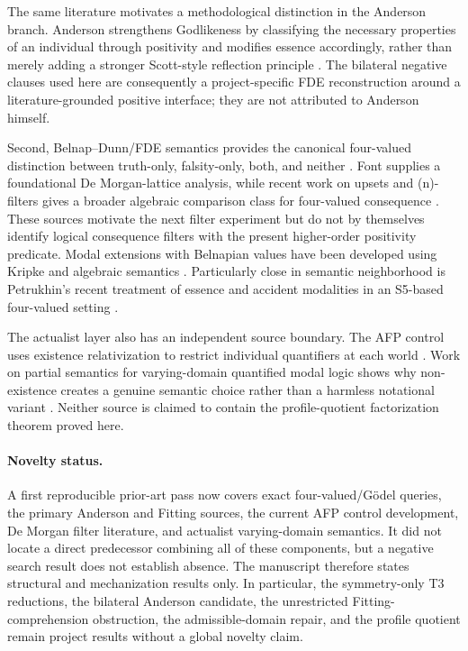 The same literature motivates a methodological distinction in the Anderson branch. Anderson strengthens Godlikeness by classifying the necessary properties of an individual through positivity and modifies essence accordingly, rather than merely adding a stronger Scott-style reflection principle \cite{BenzmuellerFuenmayor2019}. The bilateral negative clauses used here are consequently a project-specific FDE reconstruction around a literature-grounded positive interface; they are not attributed to Anderson himself.

Second, Belnap--Dunn/FDE semantics provides the canonical four-valued distinction between truth-only, falsity-only, both, and neither \cite{Belnap1977,Dunn1976}. Font supplies a foundational De Morgan-lattice analysis, while recent work on upsets and (n)-filters gives a broader algebraic comparison class for four-valued consequence \cite{Font1997,Prenosil2023}. These sources motivate the next filter experiment but do not by themselves identify logical consequence filters with the present higher-order positivity predicate. Modal extensions with Belnapian values have been developed using Kripke and algebraic semantics \cite{OdintsovWansing2010,RivieccioJungJansana2017}. Particularly close in semantic neighborhood is Petrukhin's recent treatment of essence and accident modalities in an S5-based four-valued setting \cite{Petrukhin2026}.

The actualist layer also has an independent source boundary. The AFP control uses existence relativization to restrict individual quantifiers at each world \cite{FuenmayorBenzmuellerAFP}. Work on partial semantics for varying-domain quantified modal logic shows why non-existence creates a genuine semantic choice rather than a harmless notational variant \cite{Johannesson2018}. Neither source is claimed to contain the profile-quotient factorization theorem proved here.

\paragraph{Novelty status.}
A first reproducible prior-art pass now covers exact four-valued/G\"odel queries, the primary Anderson and Fitting sources, the current AFP control development, De Morgan filter literature, and actualist varying-domain semantics. It did not locate a direct predecessor combining all of these components, but a negative search result does not establish absence. The manuscript therefore states structural and mechanization results only. In particular, the symmetry-only T3 reductions, the bilateral Anderson candidate, the unrestricted Fitting-comprehension obstruction, the admissible-domain repair, and the profile quotient remain project results without a global novelty claim.
